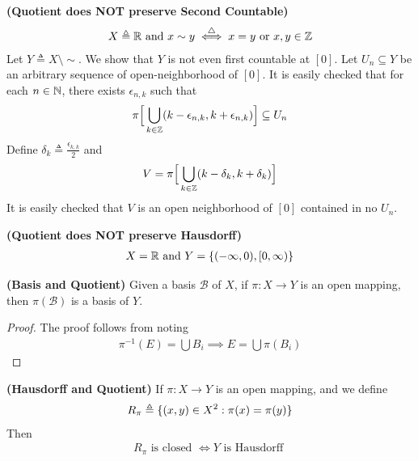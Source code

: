 \documentclass{report}
\begin{document}
\begin{Example}{\textbf{(Quotient does NOT preserve Second Countable)}}{}
\begin{align*}
X\triangleq \mathbb{R}\text{ and }x\sim y \overset{\triangle}{\iff }x=y\text{ or }x,y\in\mathbb{Z}
\end{align*}
Let $Y\triangleq X\setminus \sim $. We show that $Y$ is not even first countable at $[0]$. Let $U_n\subseteq Y$ be an arbitrary sequence of open-neighborhood of $[0]$. It is easily checked that for each $n\in\mathbb{N}$, there exists $\epsilon _{n,k}$ such that 
\begin{align*}
\pi \Big[ \bigcup_{k\in\mathbb{Z}} (k-\epsilon_{n,k},k+\epsilon_{n,k}) \Big] \subseteq U_n
\end{align*}
Define $\delta_k\triangleq \frac{\epsilon_{k,k}}{2}$ and 
\begin{align*}
V=\pi \Big[\bigcup_{k\in\mathbb{Z}} (k-\delta_k,k+\delta_k) \Big] 
\end{align*}
It is easily checked that $V$ is an open neighborhood of  $[0]$ contained in no $U_n$.
\end{Example}
\begin{Example}{\textbf{(Quotient does NOT preserve Hausdorff)}}{}
\begin{align*}
X=\mathbb{R}\text{ and }Y=\{ (-\infty,0),[0,\infty) \}
\end{align*}
\end{Example}
\begin{theorem}
\label{Basis and Quotient}
\textbf{(Basis and Quotient)} Given a basis $\mathcal{B}$ of $X$, if  $\pi:X\rightarrow Y$ is an open mapping, then $\pi (\mathcal{B})$ is a basis of $Y$.
\end{theorem}
\begin{proof}
The proof follows from noting 
\begin{align*}
\pi^{-1}(E)=\bigcup B_i \implies E=\bigcup \pi (B_i)
\end{align*}
\end{proof}
\begin{theorem}
\label{Hausdorff and Quotient}
  \textbf{(Hausdorff and Quotient)} If $\pi:X\rightarrow Y$ is an open mapping, and we define
\begin{align*}
R_\pi\triangleq \{ (x,y)\in X^2 : \pi (x)=\pi (y) \} 
\end{align*}
Then
\begin{align*}
R_\pi\text{ is closed }\iff Y\text{ is Hausdorff }
\end{align*}
\end{theorem}
\end{document}
